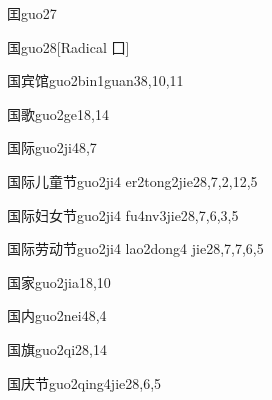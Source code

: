 \begin{entry}{囯}{guo2}{7}
\end{entry}

\begin{entry}{国}{guo2}{8}[Radical ⼞]
\end{entry}

\begin{entry}{国宾馆}{guo2bin1guan3}{8,10,11}
\end{entry}

\begin{entry}{国歌}{guo2ge1}{8,14}
\end{entry}

\begin{entry}{国际}{guo2ji4}{8,7}
\end{entry}

\begin{entry}{国际儿童节}{guo2ji4 er2tong2jie2}{8,7,2,12,5}
\end{entry}

\begin{entry}{国际妇女节}{guo2ji4 fu4nv3jie2}{8,7,6,3,5}
\end{entry}

\begin{entry}{国际劳动节}{guo2ji4 lao2dong4 jie2}{8,7,7,6,5}
\end{entry}

\begin{entry}{国家}{guo2jia1}{8,10}
\end{entry}

\begin{entry}{国内}{guo2nei4}{8,4}
\end{entry}

\begin{entry}{国旗}{guo2qi2}{8,14}
\end{entry}

\begin{entry}{国庆节}{guo2qing4jie2}{8,6,5}
\end{entry}

